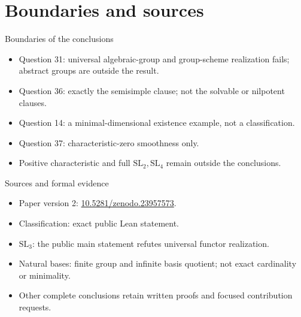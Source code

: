 \documentclass{beamer}
\begin{document}
\section[Sources]{Boundaries and sources}
\begin{frame}{Boundaries of the conclusions}
\begin{itemize}\item Question 31: universal algebraic-group and group-scheme realization fails; abstract groups are outside the result.\item Question 36: exactly the semisimple clause; not the solvable or nilpotent clauses.\item Question 14: a minimal-dimensional existence example, not a classification.\item Question 37: characteristic-zero smoothness only.\item Positive characteristic and full $\mathrm{SL}_2,\mathrm{SL}_4$ remain outside the conclusions.\end{itemize}
\end{frame}
\begin{frame}{Sources and formal evidence}
\begin{itemize}\item Paper version 2: \href{https://doi.org/10.5281/zenodo.23957573}{10.5281/zenodo.23957573}.\item Classification: exact public Lean statement.\item $\mathrm{SL}_3$: the public main statement refutes universal functor realization.\item Natural bases: finite group and infinite basis quotient; not exact cardinality or minimality.\item Other complete conclusions retain written proofs and focused contribution requests.\end{itemize}
\end{frame}
\appendix
\end{document}
